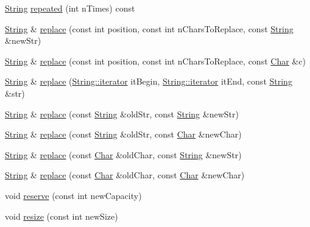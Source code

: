 \begin{DoxyCompactItemize}
\item 
\hyperlink{classprism_1_1_string}{String} \hyperlink{classprism_1_1_string_ac6aaed91f33e21a1d98a56139d678bc0}{repeated} (int n\+Times) const 
\item 
\hyperlink{classprism_1_1_string}{String} \& \hyperlink{classprism_1_1_string_a41e0509f93cfa38cd6df3f6965d6f143}{replace} (const int position, const int n\+Chars\+To\+Replace, const \hyperlink{classprism_1_1_string}{String} \&new\+Str)
\item 
\hyperlink{classprism_1_1_string}{String} \& \hyperlink{classprism_1_1_string_a4e8a35e0f084e4d382858e231bf5ed31}{replace} (const int position, const int n\+Chars\+To\+Replace, const \hyperlink{classprism_1_1_char}{Char} \&c)
\item 
\hyperlink{classprism_1_1_string}{String} \& \hyperlink{classprism_1_1_string_a0a8ad9ff92bb002dfb4c13625ad93d24}{replace} (\hyperlink{classprism_1_1_string_adacc7975837e5fff95d70690777fb330}{String\+::iterator} it\+Begin, \hyperlink{classprism_1_1_string_adacc7975837e5fff95d70690777fb330}{String\+::iterator} it\+End, const \hyperlink{classprism_1_1_string}{String} \&str)
\item 
\hyperlink{classprism_1_1_string}{String} \& \hyperlink{classprism_1_1_string_a81e268b27da75c013b41e400b2fcb2f1}{replace} (const \hyperlink{classprism_1_1_string}{String} \&old\+Str, const \hyperlink{classprism_1_1_string}{String} \&new\+Str)
\item 
\hyperlink{classprism_1_1_string}{String} \& \hyperlink{classprism_1_1_string_aeaf54043c5a919e901f6aa3a741c5019}{replace} (const \hyperlink{classprism_1_1_string}{String} \&old\+Str, const \hyperlink{classprism_1_1_char}{Char} \&new\+Char)
\item 
\hyperlink{classprism_1_1_string}{String} \& \hyperlink{classprism_1_1_string_a0d37bca0afab3f37d2be64ee4101ca53}{replace} (const \hyperlink{classprism_1_1_char}{Char} \&old\+Char, const \hyperlink{classprism_1_1_string}{String} \&new\+Str)
\item 
\hyperlink{classprism_1_1_string}{String} \& \hyperlink{classprism_1_1_string_a511c58978ebfc1278d36f38bb8fa2d27}{replace} (const \hyperlink{classprism_1_1_char}{Char} \&old\+Char, const \hyperlink{classprism_1_1_char}{Char} \&new\+Char)
\item 
void \hyperlink{classprism_1_1_string_aed752cc8c9e59a7b2366b85ab20a656b}{reserve} (const int new\+Capacity)
\item 
void \hyperlink{classprism_1_1_string_a77b3580eba01007afc7089cfd334abd5}{resize} (const int new\+Size)

\end{DoxyCompactItemize}
